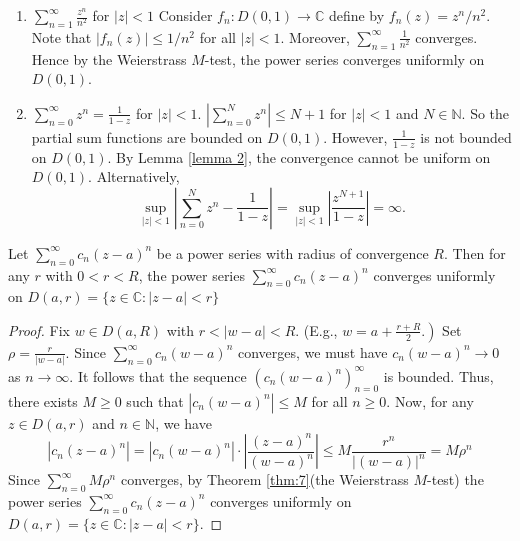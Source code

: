 \documentclass[a4paper]{article}
\begin{document}
\begin{example}
\begin{enumerate}
    \item $\sum_{n=1}^{\infty} \frac{z^{n}}{n^{2}}$ for $|z|<1$
    Consider $f_{n}: D(0,1) \rightarrow \mathbb{C}$ define by $f_{n}(z)=z^{n} / n^{2}$. Note that $\left|f_{n}(z)\right| \leqslant 1 / n^{2}$ for all $|z|<1$. Moreover, $\sum_{n=1}^{\infty} \frac{1}{n^{2}}$ converges. Hence by the Weierstrass $M$-test, the power series converges uniformly on $D(0,1)$.
    
    \item $\sum_{n=0}^{\infty} z^{n}=\frac{1}{1-z}$ for $|z|<1$.
    $\left|\sum_{n=0}^{N} z^{n}\right| \leqslant N+1$ for $|z|<1$ and $N \in \mathbb{N} .$ So the partial sum functions are bounded on $D(0,1)$. However, $\frac{1}{1-z}$ is not bounded on $D(0,1)$. By Lemma \ref{lemma 2}, the convergence cannot be uniform on $D(0,1)$.
    Alternatively,
    \[
    \sup _{|z|<1}\left|\sum_{n=0}^{N} z^{n}-\frac{1}{1-z}\right|=\sup _{|z|<1}\left|\frac{z^{N+1}}{1-z}\right|=\infty.
    \]
\end{enumerate}
\end{example}
\begin{theorem}\label{thm:8}
    Let $\sum_{n=0}^{\infty} c_{n}(z-a)^{n}$ be a power series with radius of convergence $R$. Then for any $r$ with $0<r<R$, the power series $\sum_{n=0}^{\infty} c_{n}(z-a)^{n}$ converges uniformly on $D(a, r)=\{z \in \mathbb{C}:|z-a|<r\}$
\end{theorem}
\begin{proof}
    Fix $w \in D(a, R)$ with $r<|w-a|<R$. (E.g., $\left.w=a+\frac{r+R}{2} .\right)$ Set $\rho=\frac{r}{|w-a|}$. Since $\sum_{n=0}^{\infty} c_{n}(w-a)^{n}$ converges, we must have $c_{n}(w-a)^{n} \rightarrow 0$ as $n \rightarrow \infty$. It follows that the sequence $\left(c_{n}(w-a)^{n}\right)_{n=0}^{\infty}$ is bounded. Thus, there exists $M \geqslant 0$ such that $\left|c_{n}(w-a)^{n}\right| \leqslant M$ for all $n \geqslant 0$. Now, for any $z \in D(a, r)$ and $n \in \mathbb{N}$, we have
    \[
    \left|c_{n}(z-a)^{n}\right|=\left|c_{n}(w-a)^{n}\right| \cdot\left|\frac{(z-a)^{n}}{(w-a)^{n}}\right| \leqslant M \frac{r^{n}}{|(w-a)|^{n}}=M \rho^{n}
    \]
    Since $\sum_{n=0}^{\infty} M \rho^{n}$ converges, by Theorem \ref{thm:7}(the Weierstrass $M$-test) the power series $\sum_{n=0}^{\infty} c_{n}(z-a)^{n}$ converges uniformly on $D(a, r)=\{z \in \mathbb{C}:|z-a|<r\}$.
\end{proof}
\end{document}
